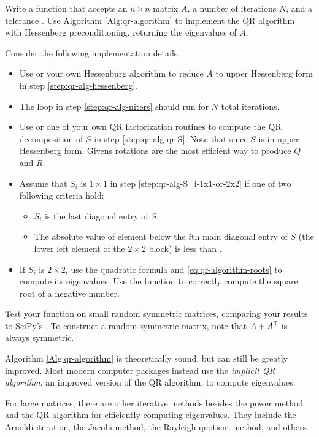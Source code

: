 \begin{problem}
Write a function that accepts an $n \times n$ matrix $A$, a number of iterations $N$, and a tolerance .
Use Algorithm \ref{Alg:qr-algorithm} to implement the QR algorithm with Hessenberg preconditioning, returning the eigenvalues of $A$.

Consider the following implementation details.
\begin{itemize}
    \item Use  or your own Hessenburg algorithm to reduce $A$ to upper Hessenberg form in step \ref{step:qr-alg-hessenberg}.
    \item The loop in step \ref{step:qr-alg-niters} should run for $N$ total iterations.
    \item Use  or one of your own QR factorization routines to compute the QR decomposition of $S$ in step \ref{step:qr-alg-qr-S}.
    Note that since $S$ is in upper Hessenberg form, Givens rotations are the most efficient way to produce $Q$ and $R$.
    \item Assume that $S_i$ is $1 \times 1$ in step \ref{step:qr-alg-S_i-1x1-or-2x2} if one of two following criteria hold:
    \begin{itemize}
        \item $S_i$ is the last diagonal entry of $S$.
        \item The absolute value of element below the $i$th main diagonal entry of $S$ (the lower left element of the $2\times 2$ block) is less than .
    \end{itemize}
    \item If $S_i$ is $2 \times 2$, use the quadratic formula and \eqref{eq:qr-algorithm-roots} to compute its eigenvalues.
    Use the function  to correctly compute the square root of a negative number.
\end{itemize}

Test your function on small random symmetric matrices, comparing your results to SciPy's .
To construct a random symmetric matrix, note that $A + A^{\mathsf T}$ is always symmetric.
\end{problem}

\begin{info}
Algorithm \ref{Alg:qr-algorithm} is theoretically sound, but can still be greatly improved.
Most modern computer packages instead use the \emph{implicit QR algorithm}, an improved version of the QR algorithm, to compute eigenvalues.

For large matrices, there are other iterative methods besides the power method and the QR algorithm for efficiently computing eigenvalues.
They include the Arnoldi iteration, the Jacobi method, the Rayleigh quotient method, and others.
\end{info}

